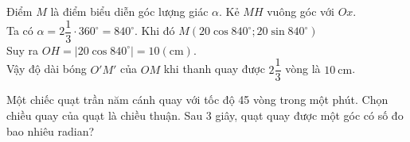 \begin{bt}
{\begin{center}
		\end{center}
		Điểm $M$ là điểm biểu diễn góc lượng giác $\alpha $. Kẻ $MH$ vuông góc với $Ox$.\\
		Ta có $\alpha =2\dfrac{1}{3}\cdot 360^\circ =840^\circ $. Khi đó $M\left(20\cos 840^\circ;20\sin 840^\circ\right)$\\
		Suy ra $OH=\left| 20\cos 840^\circ\right|=10\left(\mathrm{cm}\right)$.\\ Vậy độ dài bóng $O'M'$ của $OM$ khi thanh quay được $2\dfrac{1}{3}$ vòng là $10 ~\mathrm{cm}$.
	}
\end{bt}

\begin{bt}%
	Một chiếc quạt trần năm cánh quay với tốc độ 45 vòng trong một phút. Chọn chiều quay của quạt là chiều thuận. Sau 3 giây, quạt quay được một góc có số đo bao nhiêu radian?
\end{bt}

